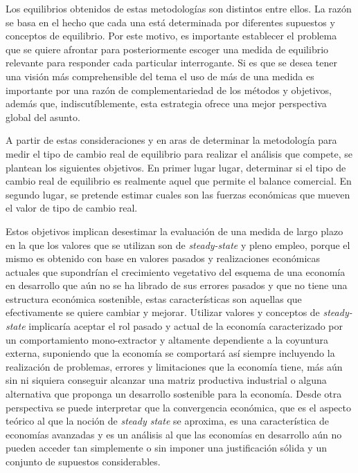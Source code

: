 \documentclass[12pt,letterpaper]{article}
\begin{document}
Los equilibrios obtenidos de estas metodologías son distintos entre ellos. La razón se basa en el hecho que cada una está determinada por diferentes supuestos y conceptos de equilibrio. Por este motivo, es importante establecer el problema que se quiere afrontar para posteriormente escoger una medida de equilibrio relevante para responder cada particular interrogante. Si es que se desea tener una visión más comprehensible del tema el uso de más de una medida es importante por una razón de complementariedad de los métodos y objetivos, además que, indiscutíblemente, esta estrategia ofrece una mejor perspectiva global del asunto.


A partir de estas consideraciones y en aras de determinar la metodología para medir el tipo de cambio real de equilibrio para realizar el análisis que compete, se plantean los siguientes objetivos. En primer lugar lugar, determinar si el tipo de cambio real de equilibrio es realmente aquel que permite el balance comercial. En segundo lugar, se pretende estimar cuales son las fuerzas económicas que mueven el valor de tipo de cambio real. 

Estos objetivos implican desestimar la evaluación de una medida de largo plazo en la que los valores que se utilizan son de \emph{steady-state} y pleno empleo, porque el mismo es obtenido con base en valores pasados y realizaciones económicas actuales que supondrían el crecimiento vegetativo del esquema de una economía en desarrollo que aún no se ha librado de sus errores pasados y que no tiene una estructura económica sostenible, estas características son aquellas que efectivamente se quiere cambiar y mejorar. Utilizar valores y conceptos de \emph{steady-state} implicaría aceptar el rol pasado y actual de la economía caracterizado por un comportamiento mono-extractor y altamente dependiente a la coyuntura externa, suponiendo que la economía se comportará así siempre incluyendo la realización de problemas, errores y limitaciones que la economía tiene, más aún sin ni siquiera conseguir alcanzar una matriz productiva industrial o alguna alternativa que proponga un desarrollo sostenible para la economía. Desde otra perspectiva se puede interpretar que la convergencia económica, que es el aspecto teórico al que la noción de \emph{steady state} se aproxima, es una característica de economías avanzadas y es un análisis al que las economías en desarrollo aún no pueden acceder tan simplemente o sin imponer una justificación sólida y un conjunto de supuestos considerables.
\end{document}
